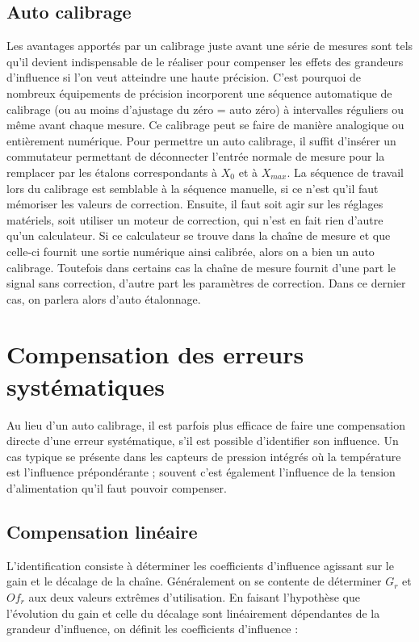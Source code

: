 \subsection{Auto calibrage }
Les avantages apportés par un calibrage juste avant une série de mesures sont tels qu'il devient indispensable de le réaliser pour compenser les effets des grandeurs d'influence si l'on veut atteindre une haute précision. C'est pourquoi de nombreux équipements de précision incorporent une séquence automatique de calibrage (ou au moins d'ajustage du zéro = auto zéro) à intervalles réguliers ou même avant chaque mesure. Ce calibrage peut se faire de manière analogique ou entièrement numérique.
Pour permettre un auto calibrage, il suffit d'insérer un commutateur permettant de déconnecter l'entrée normale de mesure pour la remplacer par les étalons correspondants à $X_0$ et à $X_{max}$. La séquence de travail lors du calibrage est semblable à la séquence manuelle, si ce n'est qu'il faut mémoriser les valeurs de correction. Ensuite, il faut soit agir sur les réglages matériels, soit utiliser un moteur de correction, qui n'est en fait rien d'autre qu'un calculateur. Si ce calculateur se trouve dans la chaîne de mesure et que celle-ci fournit une sortie numérique ainsi calibrée, alors on a bien un auto calibrage. Toutefois dans certains cas la chaîne de mesure fournit d'une part le signal sans correction, d'autre part les paramètres de correction. Dans ce dernier cas, on parlera alors d'auto étalonnage.

\section{Compensation des erreurs systématiques}

Au lieu d'un auto calibrage, il est parfois plus efficace de faire une compensation directe d'une erreur systématique, s'il est possible d'identifier son influence. Un cas typique se présente dans les capteurs de pression intégrés où la température est l'influence prépondérante ; souvent c'est également l'influence de la tension d'alimentation qu'il faut pouvoir compenser.

\subsection{Compensation linéaire }
L'identification consiste à déterminer les coefficients d'influence agissant sur le gain et le décalage de la chaîne. Généralement on se contente de déterminer $G_r$ et $Of_r$ aux deux valeurs extrêmes d'utilisation. En faisant l'hypothèse que l'évolution du gain et celle du décalage sont linéairement dépendantes de la grandeur d'influence, on définit les coefficients d'influence :

